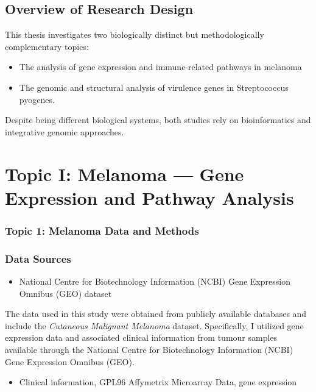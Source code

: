 \documentclass[
]{article}
\providecommand{\tightlist}{%
  \setlength{\itemsep}{0pt}\setlength{\parskip}{0pt}}
\begin{document}
\subsection{Overview of Research
Design}\label{overview-of-research-design}

This thesis investigates two biologically distinct but methodologically
complementary topics:

\begin{itemize}
\item
  The analysis of gene expression and immune-related pathways in
  melanoma
\item
  The genomic and structural analysis of virulence genes in
  Streptococcus pyogenes.
\end{itemize}

Despite being different biological systems, both studies rely on
bioinformatics and integrative genomic approaches.

\section{Topic I: Melanoma --- Gene Expression and Pathway
Analysis}\label{topic-i-melanoma-gene-expression-and-pathway-analysis}

\subsubsection{Topic 1: Melanoma Data and
Methods}\label{topic-1-melanoma-data-and-methods}

\subsubsection{Data Sources}\label{data-sources}

\begin{itemize}
\tightlist
\item
  National Centre for Biotechnology Information (NCBI) Gene Expression
  Omnibus (GEO) dataset
\end{itemize}

The data used in this study were obtained from publicly available
databases and include the \emph{Cutaneous Malignant Melanoma} dataset.
Specifically, I utilized gene expression data and associated clinical
information from tumour samples available through the National Centre
for Biotechnology Information (NCBI) Gene Expression Omnibus (GEO).

\begin{itemize}
\tightlist
\item
  Clinical information, GPL96 Affymetrix Microarray Data, gene
  expression
\end{itemize}
\end{document}
